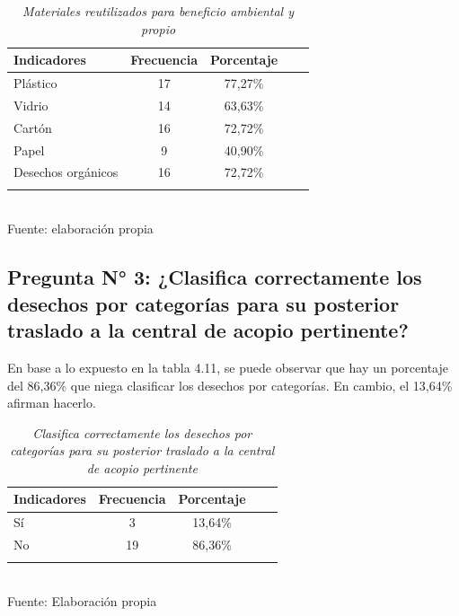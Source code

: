 \newpage

\begin{table}[h!]
    \centering
    \captionsetup{singlelinecheck=false, justification=raggedright, labelsep=newline}
    \caption{\textit{Materiales reutilizados para beneficio ambiental y propio}}
    \begin{tabular}{lcccc}
        \toprule
        Indicadores & Frecuencia & Porcentaje\\
        \midrule
        Plástico & 17 & 77,27\% \\
        Vidrio & 14 & 63,63\%\\
        Cartón & 16 & 72,72\% \\
        Papel & 9 & 40,90\% \\
        Desechos orgánicos & 16 & 72,72\% \\
        \bottomrule
        \\
    \end{tabular}
    \\\RaggedRight Fuente: elaboración propia
    \label{table:cuadro10}
\end{table}


{\setlength{\parskip}{0cm}
\subsection{Pregunta N° 3: ¿Clasifica correctamente los desechos por categorías para su posterior traslado a la central de acopio pertinente?}

En base a lo expuesto en la tabla 4.11, se puede observar que hay un porcentaje del 86,36\% que niega clasificar los desechos por categorías. En cambio, el 13,64\% afirman hacerlo.
}

\begin{table}[h!]
    \centering
    \captionsetup{singlelinecheck=false, justification=raggedright, labelsep=newline}
    \caption{\textit{Clasifica correctamente los desechos por categorías para su posterior traslado a la central de acopio pertinente}}
    \begin{tabular}{lcccc}
        \toprule
        Indicadores & Frecuencia & Porcentaje\\
        \midrule
        Sí & 3 & 13,64\% \\
        No & 19 & 86,36\%\\
        \bottomrule\\
    \end{tabular}
    \\\RaggedRight Fuente: Elaboración propia
    \label{table:cuadro11}
\end{table}


